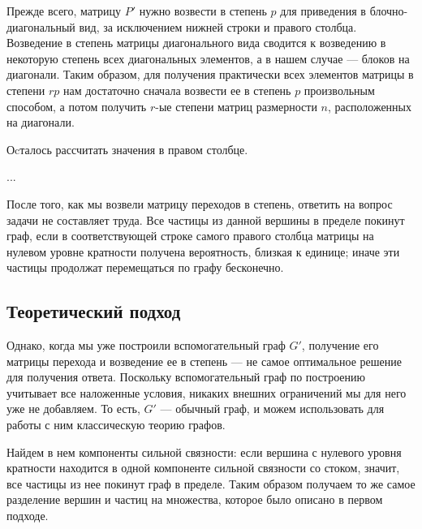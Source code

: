 	Прежде всего, матрицу $P'$ нужно возвести в степень $p$ для приведения в блочно-диагональный вид, за исключением нижней строки и правого столбца. Возведение в степень матрицы диагонального вида сводится к возведению в некоторую степень всех диагональных элементов, а в нашем случае --- блоков на диагонали. Таким образом, для получения практически всех элементов матрицы в степени $rp$ нам достаточно сначала возвести ее в степень $p$ произвольным способом, а потом получить $r$-ые степени матриц размерности $n$, расположенных на диагонали. 
	
	Оcталось рассчитать значения в правом столбце. 
	
	...
	
	После того, как мы возвели матрицу переходов в степень, ответить на вопрос задачи не составляет труда. Все частицы из данной вершины в пределе покинут граф, если в соответствующей строке самого правого столбца матрицы на нулевом уровне кратности получена вероятность, близкая к единице; иначе эти частицы продолжат перемещаться по графу бесконечно. 
	
	\subsection{Теоретический подход}
	
	Однако, когда мы уже построили вспомогательный граф $G'$, получение его матрицы перехода и возведение ее в степень --- не самое оптимальное решение для получения ответа. Поскольку вспомогательный граф по построению учитывает все наложенные условия, никаких внешних ограничений мы для него уже не добавляем. То есть, $G'$ --- обычный граф, и можем использовать для работы с ним классическую теорию графов. 
	
	Найдем в нем компоненты сильной связности: если вершина с нулевого уровня кратности находится в одной компоненте сильной связности со стоком, значит, все частицы из нее покинут граф в пределе. Таким образом получаем то же самое разделение вершин и частиц на множества, которое было описано в первом подходе.  
	
	\newpage %
	
	\printbibliography[
	heading=bibintoc%
	,title=Библиография %
	]
	

